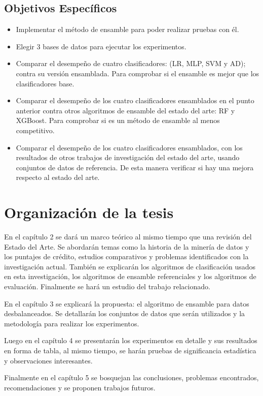 \subsection{Objetivos Específicos}

\begin{itemize}
	\item Implementar el método de ensamble para poder realizar pruebas con él.

	\item Elegir 3 bases de datos para ejecutar los experimentos.

	\item Comparar el desempeño de cuatro clasificadores: (\ac{LR}, \ac{MLP}, \ac{SVM} y \ac{AD}); contra su versión ensamblada. Para comprobar si el ensamble es mejor que los clasificadores base.

	\item Comparar el desempeño de los cuatro clasificadores ensamblados en el punto anterior contra otros algoritmos de ensamble del estado del arte: \ac{RF} y \ac{XGBoost}. Para comprobar si es un método de ensamble al menos competitivo.

	\item Comparar el desempeño de los cuatro clasificadores ensamblados, con los resultados de otros trabajos de investigación del estado del arte, usando conjuntos de datos de referencia. De esta manera verificar si hay una mejora respecto al estado del arte.
\end{itemize}

\section{Organización de la tesis}

En el capítulo 2 se dará un marco teórico al mismo tiempo que una revisión del Estado del Arte. Se abordarán temas como la historia de la minería de datos y los puntajes de crédito, estudios comparativos y problemas identificados con la investigación actual. También se explicarán los algoritmos de clasificación usados en esta investigación, los algoritmos de ensamble referenciales y los algoritmos de evaluación. Finalmente se hará un estudio del trabajo relacionado.

En el capítulo 3 se explicará la propuesta: el algoritmo de ensamble para datos desbalanceados. Se detallarán los conjuntos de datos que serán utilizados y la metodología para realizar los experimentos.

Luego en el capítulo 4 se presentarán los experimentos en detalle y sus resultados en forma de tabla, al mismo tiempo, se harán pruebas de significancia estadística y observaciones interesantes.

Finalmente en el capítulo 5 se bosquejan las conclusiones, problemas encontrados, recomendaciones y se proponen trabajos futuros.


